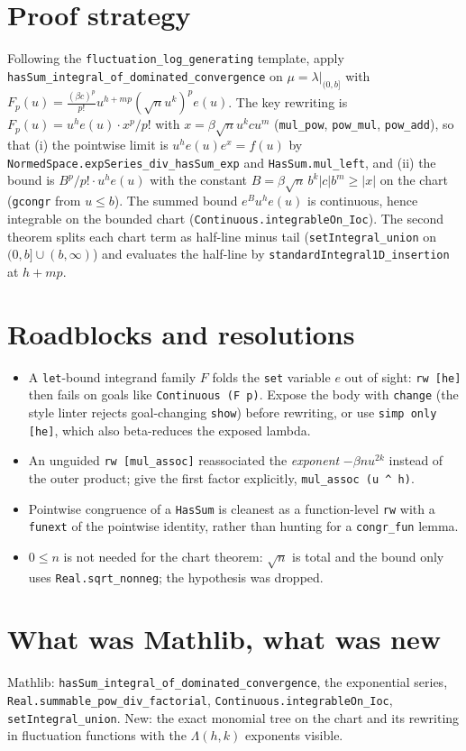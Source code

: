 \documentclass[11pt]{article}
\begin{document}
\section{Proof strategy}
Following the \texttt{fluctuation\_log\_generating} template, apply
\texttt{hasSum\_integral\_of\_dominated\_convergence} on $\mu=\lambda|_{(0,b]}$ with
$F_p(u)=\frac{(\beta c)^p}{p!}u^{h+mp}(\sqrt nu^k)^pe(u)$. The key rewriting is
$F_p(u)=u^he(u)\cdot x^p/p!$ with $x=\beta\sqrt nu^kcu^m$ (\texttt{mul\_pow}, \texttt{pow\_mul},
\texttt{pow\_add}), so that (i) the pointwise limit is $u^he(u)e^{x}=f(u)$ by
\texttt{NormedSpace.expSeries\_div\_hasSum\_exp} and \texttt{HasSum.mul\_left}, and (ii) the bound is
$B^p/p!\cdot u^he(u)$ with the constant $B=\beta\sqrt n\,b^k|c|b^m\ge|x|$ on the chart
(\texttt{gcongr} from $u\le b$). The summed bound $e^Bu^he(u)$ is continuous, hence integrable on the
bounded chart (\texttt{Continuous.integrableOn\_Ioc}). The second theorem splits each chart term as
half-line minus tail (\texttt{setIntegral\_union} on $(0,b]\cup(b,\infty)$) and evaluates the half-line
by \texttt{standardIntegral1D\_insertion} at $h+mp$.

\section{Roadblocks and resolutions}
\begin{itemize}
\item A \texttt{let}-bound integrand family $F$ folds the \texttt{set} variable $e$ out of sight:
\texttt{rw [he]} then fails on goals like \texttt{Continuous (F p)}. Expose the body with
\texttt{change} (the style linter rejects goal-changing \texttt{show}) before rewriting, or use
\texttt{simp only [he]}, which also beta-reduces the exposed lambda.
\item An unguided \texttt{rw [mul\_assoc]} reassociated the \emph{exponent} $-\beta nu^{2k}$ instead of
the outer product; give the first factor explicitly, \texttt{mul\_assoc (u \^{} h)}.
\item Pointwise congruence of a \texttt{HasSum} is cleanest as a function-level \texttt{rw} with a
\texttt{funext} of the pointwise identity, rather than hunting for a \texttt{congr\_fun} lemma.
\item $0\le n$ is not needed for the chart theorem: $\sqrt n$ is total and the bound only uses
\texttt{Real.sqrt\_nonneg}; the hypothesis was dropped.
\end{itemize}

\section{What was Mathlib, what was new}
Mathlib: \texttt{hasSum\_integral\_of\_dominated\_convergence}, the exponential series,
\texttt{Real.summable\_pow\_div\_factorial}, \texttt{Continuous.integrableOn\_Ioc},
\texttt{setIntegral\_union}. New: the exact monomial tree on the chart and its rewriting in fluctuation
functions with the $\Lambda(h,k)$ exponents visible.
\end{document}
